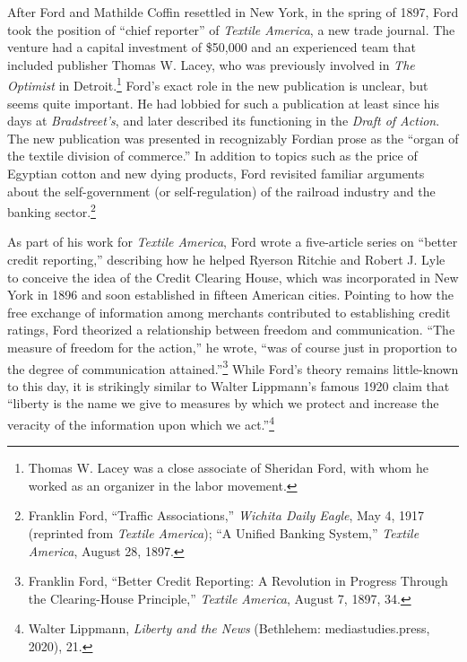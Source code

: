 \documentclass[openany,nobib]{tufte-book}
\begin{document}
After Ford and Mathilde Coffin resettled in New York, in the spring of
1897, Ford took the position of ``chief reporter'' of \emph{Textile
America}, a new trade journal. The venture had a capital investment of
\$50,000 and an experienced team that included publisher Thomas W.
Lacey, who was previously involved in \emph{The Optimist} in
Detroit.\footnote{Thomas W. Lacey was a close associate of Sheridan
  Ford, with whom he worked as an organizer in the labor movement.}
Ford's exact role in the new publication is unclear, but seems quite
important. He had lobbied for such a publication at least since his days
at \emph{Bradstreet's}, and later described its functioning in the
\emph{Draft of Action}. The new publication was presented in
recognizably Fordian prose as the ``organ of the textile division of
commerce.'' In addition to topics such as the price of Egyptian cotton
and new dying products, Ford revisited familiar arguments about the
self-government (or self-regulation) of the railroad industry and the
banking sector.\footnote{Franklin Ford, ``Traffic Associations,''
  \emph{Wichita Daily Eagle}, May 4, 1917 (reprinted from \emph{Textile
  America}); ``A Unified Banking System,'' \emph{Textile America},
  August 28, 1897.}

\newpage As part of his work for \emph{Textile America}, Ford wrote a
five-article series on ``better credit reporting,'' describing how he
helped Ryerson Ritchie and Robert J. Lyle to conceive the idea of the
Credit Clearing House, which was incorporated in New York in 1896 and
soon established in fifteen American cities. Pointing to how the free
exchange of information among merchants contributed to establishing
credit ratings, Ford theorized a relationship between freedom and
communication. ``The measure of freedom for the action,'' he
wrote, ``was of course just in proportion to the degree of communication
attained.''\footnote{Franklin Ford, ``Better Credit Reporting: A
  Revolution in Progress Through the Clearing-House Principle,''
  \emph{Textile America}, August 7, 1897, 34.} While Ford's theory
remains little-known to this day, it is strikingly similar to Walter
Lippmann's famous 1920 claim that ``liberty is the name we give to
measures by which we protect and increase the veracity of the
information upon which we act.''\footnote{Walter Lippmann, \emph{Liberty
  and the News} (Bethlehem: mediastudies.press, 2020), 21.}

\enlargethispage{\baselineskip}
\end{document}
